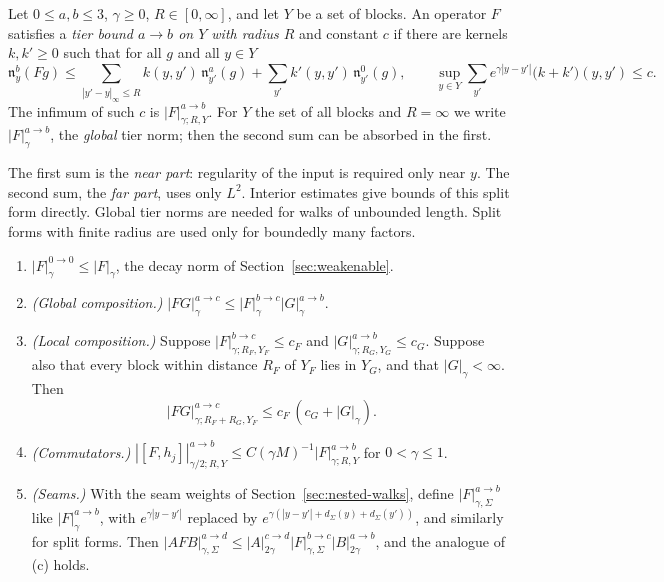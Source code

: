 \begin{definition}\label{def:tier}
Let $0\le a,b\le3$, $\gamma\ge0$, $R\in[0,\infty]$, and let $Y$ be a set of blocks. An operator $F$ satisfies a \emph{tier bound $a\to b$ on $Y$ with radius $R$} and constant $c$ if there are kernels $k,k'\ge0$ such that for all $g$ and all $y\in Y$
\[
\mathfrak n^b_y(Fg)\le\sum_{|y'-y|_\infty\le R}k(y,y')\,\mathfrak n^a_{y'}(g)+\sum_{y'}k'(y,y')\,\mathfrak n^0_{y'}(g),\qquad\sup_{y\in Y}\sum_{y'}e^{\gamma|y-y'|}\big(k+k'\big)(y,y')\le c .
\]
The infimum of such $c$ is $|F|^{a\to b}_{\gamma;R,Y}$. For $Y$ the set of all blocks and $R=\infty$ we write $|F|^{a\to b}_\gamma$, the \emph{global} tier norm; then the second sum can be absorbed in the first.
\end{definition}

The first sum is the \emph{near part}: regularity of the input is required only near $y$. The second sum, the \emph{far part}, uses only $L^2$. Interior estimates give bounds of this split form directly. Global tier norms are needed for walks of unbounded length. Split forms with finite radius are used only for boundedly many factors.

\begin{lemma}\label{lem:tier-calculus}
\begin{enumerate}[label=(\alph*)]
\item $|F|^{0\to0}_\gamma\le|F|_\gamma$, the decay norm of Section~\ref{sec:weakenable}.
\item \emph{(Global composition.)} $|FG|^{a\to c}_\gamma\le|F|^{b\to c}_\gamma|G|^{a\to b}_\gamma$.
\item \emph{(Local composition.)} Suppose $|F|^{b\to c}_{\gamma;R_F,Y_F}\le c_F$ and $|G|^{a\to b}_{\gamma;R_G,Y_G}\le c_G$. Suppose also that every block within distance $R_F$ of $Y_F$ lies in $Y_G$, and that $|G|_\gamma<\infty$. Then
\[
|FG|^{a\to c}_{\gamma;R_F+R_G,Y_F}\le c_F\,(c_G+|G|_\gamma).
\]
\item \emph{(Commutators.)} $|[F,h_j]|^{a\to b}_{\gamma/2;R,Y}\le C(\gamma M)^{-1}|F|^{a\to b}_{\gamma;R,Y}$ for $0<\gamma\le1$.
\item \emph{(Seams.)} With the seam weights of Section~\ref{sec:nested-walks}, define $|F|^{a\to b}_{\gamma,\Sigma}$ like $|F|^{a\to b}_\gamma$, with $e^{\gamma|y-y'|}$ replaced by $e^{\gamma(|y-y'|+d_\Sigma(y)+d_\Sigma(y'))}$, and similarly for split forms. Then $|AFB|^{a\to d}_{\gamma,\Sigma}\le|A|^{c\to d}_{2\gamma}|F|^{b\to c}_{\gamma,\Sigma}|B|^{a\to b}_{2\gamma}$, and the analogue of (c) holds.
\end{enumerate}
\end{lemma}

